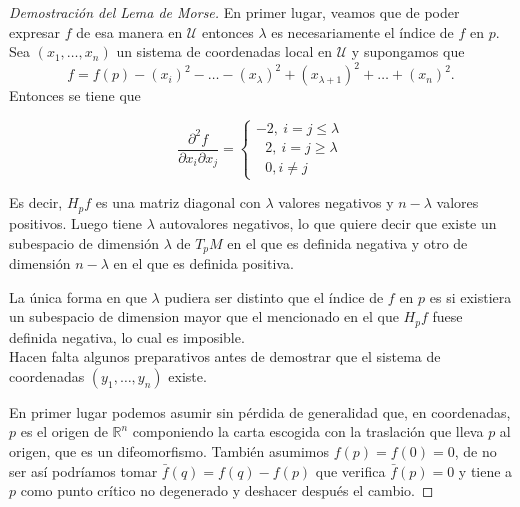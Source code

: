 \begin{proof}[Demostración del Lema de Morse]
    En primer lugar, veamos que de poder expresar $f$ de esa manera en $\mathcal{U}$ entonces $\lambda$ es necesariamente el índice de $f$ en $p$. Sea $(x_1,\dots, x_n)$ un sistema de coordenadas local en $\mathcal{U}$ y supongamos que
    \begin{equation*}
        f=f(p)-(x_i)^2-\dots-(x_\lambda)^2 + (x_{\lambda +1})^2+\dots + (x_n)^2.
    \end{equation*}
    Entonces se tiene que 

    \[
        \frac{\partial^2 f}{\partial x_i \partial x_j}=
        \begin{cases}
            -2, ~i=j\le \lambda\\
            ~~~2, ~i=j\ge \lambda\\
            ~~~0, i\neq j
        \end{cases}
    \]

    Es decir, $H_pf$ es una matriz diagonal con $\lambda$ valores negativos y $n-\lambda$ valores positivos. Luego tiene $\lambda$ autovalores negativos, lo que quiere decir que existe un subespacio de dimensión $\lambda$ de $T_pM$ en el que es definida negativa y otro de dimensión $n-\lambda$ en el que es definida positiva.

    La única forma en que $\lambda$ pudiera ser distinto que el índice de $f$ en $p$ es si existiera un subespacio de dimension mayor que el mencionado en el que $H_pf$ fuese definida negativa, lo cual es imposible.\\


    Hacen falta algunos preparativos antes de demostrar que el sistema de coordenadas $(y_1,\dots,y_n)$ existe.
    
    En primer lugar podemos asumir sin pérdida de generalidad que, en coordenadas, $p$ es el origen de $\mathbb{R}^n$ componiendo la carta escogida con la traslación que lleva $p$ al origen, que es un difeomorfismo. También asumimos $f(p)=f(0)=0$, de no ser así podríamos tomar $\bar{f}(q)=f(q)-f(p)$ que verifica $\bar{f}(p)=0$ y tiene a $p$ como punto crítico no degenerado y deshacer después el cambio. 


\end{proof}

